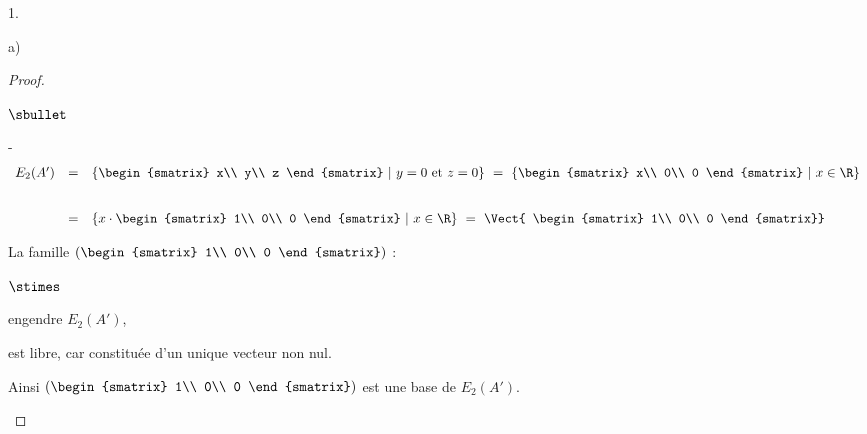 \begin{noliste}{1.}
\begin{noliste}{a)}
\begin{proof}
\begin{noliste}{$\sbullet$}
\begin{noliste}{-}
\[\begin{array}{rcl}
	      E_2(A') & = &  \{ 
	      \begin{smatrix}
	        x\\
	        y\\
	        z
	      \end{smatrix} \ | \ y=0 \ \text{et} \ z=0 \}
	      \ = \ \{
	      \begin{smatrix}
	        x\\
	        0\\
	        0
	      \end{smatrix} \ | \ x \in \R \}
	      \\[.8cm]
	      & = &  \{ x \cdot 
	      \begin{smatrix}
	        1\\
	        0\\
	        0
	      \end{smatrix} \ | \ x \in \R \}
	      \ = \ \Vect{
	      \begin{smatrix}
	        1\\
	        0\\
	        0
	      \end{smatrix}}
	    \end{array}
	  \]
	  
	  
	  
	  \newpage
	  
	  
	  
	  La famille $\left(
	  \begin{smatrix}
	    1\\
	    0\\
	    0
	  \end{smatrix}\right)$ :
	  \end{noliste}
	  \begin{liste}{$\stimes$}
	    \item engendre $E_2(A')$,
	    \item est libre, car constituée d'un unique vecteur non 
	    nul.
	  \end{liste}
	  Ainsi $\left(
	  \begin{smatrix}
	    1\\
	    0\\
	    0
	  \end{smatrix}\right)$ est une base de $E_2(A')$.
	  

\end{noliste}
\end{proof}
\end{noliste}
\end{noliste}
